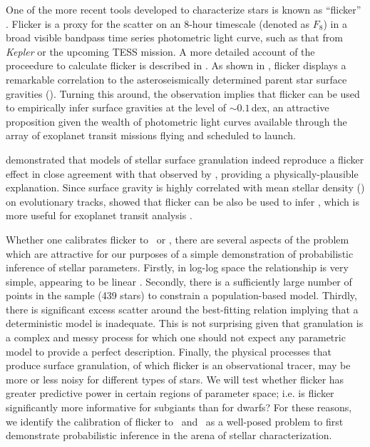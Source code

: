 

One of the more recent tools developed to characterize stars is known as
``flicker'' \citep{bastien:2013}.
Flicker is a proxy for the scatter on an 8-hour timescale (denoted as $F_8$)
in a broad visible bandpass time series photometric light curve, such as that
from \textit{Kepler} or the upcoming TESS mission. A more detailed account of
the proceedure to calculate flicker is described in \citet{bastien:2013}. As
shown in \citet{bastien:2013}, flicker displays a remarkable correlation to
the asteroseismically determined parent star surface gravities (\logg).
Turning this around, the observation implies that flicker can be used to
empirically infer surface gravities at the level of $\sim0.1$\,dex, an
attractive proposition given the wealth of photometric light curves available
through the array of exoplanet transit missions flying and scheduled to
launch.

\citet{cranmer:2014} demonstrated that models of stellar surface granulation
indeed reproduce a flicker effect in close agreement with that observed by
\citet{bastien:2013}, providing a physically-plausible explanation.
Since surface gravity is highly correlated with mean stellar density (\rhostar)
on evolutionary tracks, \citet{kipping:2014} showed that flicker can be also
be used to infer \rhostar, which is more useful for exoplanet transit analysis
\citep{seager:2003}.

Whether one calibrates flicker to \logg\ or \rhostar, there are several aspects
of the problem which are attractive for our purposes of a simple demonstration
of probabilistic inference of stellar parameters.
Firstly, in log-log space the relationship is very simple, appearing to be
linear \citep{kipping:2014}.
Secondly, there is a sufficiently large number of points in the sample (439
stars) to constrain a population-based model.
Thirdly, there is significant excess scatter around the best-fitting relation
implying that a deterministic model is inadequate.
This is not surprising given that granulation is a complex and messy process
for which one should not expect any parametric model to provide a perfect
description.
Finally, the physical processes that produce surface granulation, of which
flicker is an observational tracer, may be more or less noisy for different
types of stars.
We will test whether flicker has greater predictive power in certain regions
of parameter space; i.e. is flicker significantly more informative for
subgiants than for dwarfs?
For these reasons, we identify the calibration of
flicker to \logg\ and \rhostar\ as a well-posed problem to first demonstrate
probabilistic inference in the arena of stellar characterization.


